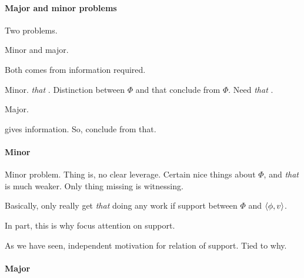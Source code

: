 \paragraph*{Major and minor problems}

\begin{note}
  Two problems.

  Minor and major.

  Both comes from information required.

  Minor.
  \emph{that} .
  Distinction between \(\Phi\) and that conclude from \(\Phi\).
  Need \emph{that} .

  Major.

  \itp{} gives information.
  So, conclude from that.
\end{note}

\paragraph*{Minor}

\begin{note}[Minor]
  Minor problem.
  Thing is, no clear leverage.
  Certain nice things about \(\Phi\), and \emph{that}  is much weaker.
  Only thing missing is witnessing.

  Basically, only really get \emph{that}  doing any work if support between \(\Phi\) and \(\langle \phi, v \rangle\).

  In part, this is why focus attention on support.

  As we have seen, independent motivation for relation of support.
  Tied to why.
\end{note}

\paragraph*{Major}

